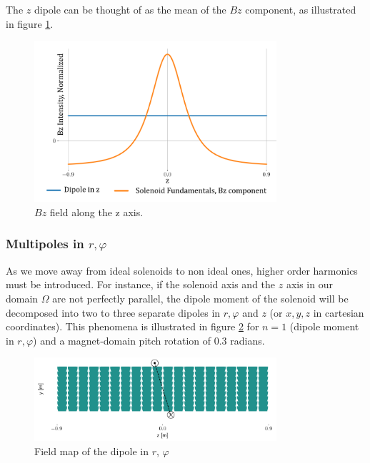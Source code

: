 The $z$ dipole can be thought of as the mean of the $Bz$
component, as illustrated in figure \ref{fig:solfundipplot}.

\begin{figure}[!h]
    \centering
    \includegraphics[width=0.8\textwidth]{figs/solfundipplot.png}
    \caption{$Bz$ field along the z axis.}
    \label{fig:solfundipplot}
\end{figure}

\subsubsection{Multipoles in $r, \varphi$}
As we move away from ideal solenoids to non ideal ones,
higher order harmonics must be introduced. For instance,
if the solenoid axis and the $z$ axis in our domain $\Omega$
are not perfectly parallel, the dipole moment of the solenoid 
will be decomposed into two to three separate dipoles in
$r, \varphi$ and $z$ (or $x,y,z$ in cartesian coordinates).
This phenomena is illustrated in figure \ref{fig:rphidip}
for $n=1$ (dipole moment in $r, \varphi$) and a
magnet-domain pitch rotation of 0.3 radians.

\begin{figure}[!h]
    \centering
    \includegraphics[width=0.8\textwidth]{figs/rphidip.png}
    \caption{Field map of the dipole in $r$, $\varphi$}
    \label{fig:rphidip}
\end{figure}

